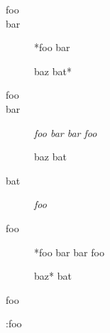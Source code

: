 
\def\mytitle{Definition Lists}


\begin{description}
\item[foo]
\item[bar]
*foo bar

baz bat*

\item[foo]
\item[bar]
\emph{foo bar
bar foo}

baz bat

\item[bat]
\emph{foo}

\item[foo]
*foo bar
bar foo

baz* bat
\end{description}

foo

:foo


